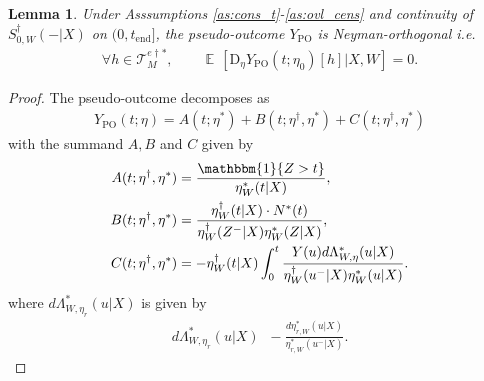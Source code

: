 \documentclass{article}
\newtheorem{lemma}[theorem]{Lemma}
\DeclareMathOperator*{\eqdef }{\,\stackrel{\text{def}}{=}\,}
\DeclareMathOperator{\IDF}{\mathbbm{1}}%
\DeclareMathOperator{\EX}{\mathbb{E}\,}
\newcommand{\tend}{t_{\mathrm{end}}}
\newcommand{\YPO}{Y_{\mathrm{PO}}}
\newcommand{\bD}{\mathrm{D}}
\begin{document}
\begin{lemma}\label{lem:PO_orth}
Under Asssumptions \ref{as:cons_t}-\ref{as:ovl_cens} and continuity of $S_{0,W}^\dagger(-|X)$ on $(0,\tend]$, 
the pseudo-outcome $\YPO$ is Neyman-orthogonal i.e. 
\begin{align*}
\forall h \in \mathscr{T}_M^{e\dagger*}, \qquad \EX[ \bD_\eta  \YPO (t;\eta_0) [h] | X,W] = 0.
\end{align*}
\end{lemma}
\begin{proof}
The pseudo-outcome decomposes as
\begin{align*}
\YPO(t ; \eta) = A(t ; \eta^*) 
+ B(t ; \eta^\dagger, \eta^*)
+ C(t ; \eta^\dagger, \eta^*)
\end{align*}
with the summand $A,B$ and $C$ given by
\begin{align*}
A(t; \eta^\dagger, \eta^*) &= \frac{\IDF\{Z > t\}}{\eta_W^*(t|X)},\\ 
B(t; \eta^\dagger, \eta^*) &= \frac{ \eta_W^\dagger(t|X) \cdot N^*(t) }{\eta_W^\dagger(Z^-|X) \eta_W^*(Z|X) },\\
C(t; \eta^\dagger, \eta^*) &=  - \eta_W^\dagger(t|X) \int_{0}^{t} \frac{Y(u)  d\Lambda^*_{W,\eta}(u|X)}{\eta_W^\dagger(u^-|X) \eta_W^\ast(u|X)} .
\end{align*}
where $d\Lambda^*_{W,\eta_r}(u|X)$ is given by
\begin{align*}
  d\Lambda^*_{W,\eta_r}(u|X) \eqdef - \frac{d \eta_{r,W}^*(u|X)}{\eta_{r,W}^*(u^-|X)}.
\end{align*}


\end{proof}
\end{document}
